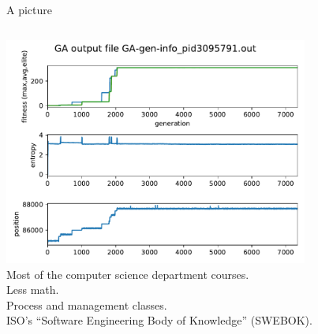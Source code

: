 \documentclass[10pt,aspectratio=169]{beamer}
\begin{document}
\begin{frame}{A picture}
\begin{columns}
    \begin{column}{0.6\textwidth}
      \includegraphics[width=0.75\textwidth]{GA-gen-info_pid3095791.out.pdf}
      \\
      \pause
      Most of the computer science department courses.\\
      \pause
      Less math.\\
      \pause
      Process and management classes.\\
      \pause
      ISO's ``Software Engineering Body of Knowledge'' (SWEBOK).
      
    \end{column}
  \end{columns}
\end{frame}










\end{document}
